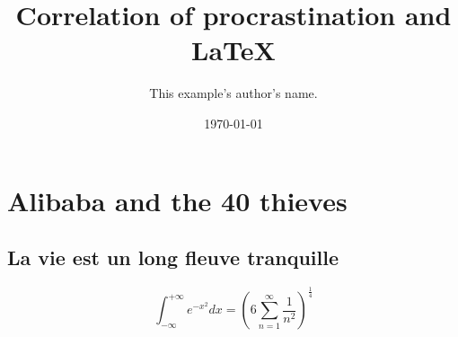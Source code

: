 \documentclass[draft, pdftex, a4paper, 12pt, openbib, ]{article} %
\title{}
\author{This example's author's name.}
\date{\today}
\begin{document}



\title{Correlation of procrastination and \LaTeX}

\maketitle

\textrm{\lipsum[11]}

\textsf{\lipsum[11]}

\texttt{\lipsum[11]}

\section{Alibaba and the 40 thieves}

\subsection{La vie est un long fleuve tranquille}


\begin{equation}
\int_{-\infty}^{+\infty} e^{-x^2} dx = \left( 6 \sum_{n=1}^{\infty} \frac{1}{n^2} \right)^\frac{1}{4}
\end{equation}

\lipsum[1-7]
\end{document}
